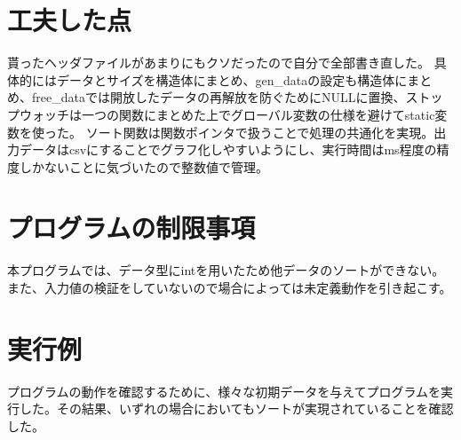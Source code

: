 \documentclass[dvipdfmx, a4paper, titlepage]{jsarticle}
\begin{document}
\section{工夫した点}
貰ったヘッダファイルがあまりにもクソだったので自分で全部書き直した。
具体的にはデータとサイズを構造体にまとめ、gen\_dataの設定も構造体にまとめ、free\_dataでは開放したデータの再解放を防ぐためにNULLに置換、ストップウォッチは一つの関数にまとめた上でグローバル変数の仕様を避けてstatic変数を使った。
ソート関数は関数ポインタで扱うことで処理の共通化を実現。出力データはcsvにすることでグラフ化しやすいようにし、実行時間はms程度の精度しかないことに気づいたので整数値で管理。

\section{プログラムの制限事項}
本プログラムでは、データ型にintを用いたため他データのソートができない。また、入力値の検証をしていないので場合によっては未定義動作を引き起こす。

\section{実行例}
プログラムの動作を確認するために、様々な初期データを与えてプログラムを実行した。その結果、いずれの場合においてもソートが実現されていることを確認した。
\end{document}

